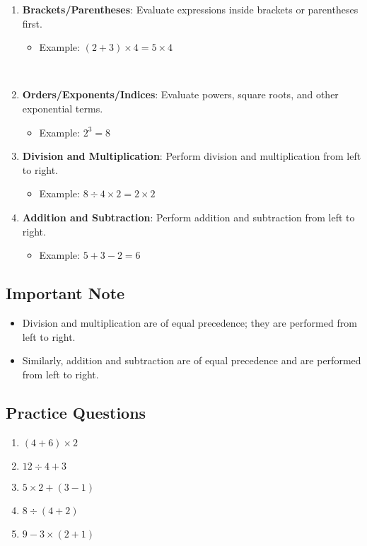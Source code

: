 \documentclass{article}
\begin{document}
\begin{enumerate}
\item \textbf{Brackets/Parentheses}: Evaluate expressions inside brackets or parentheses first.

\begin{itemize}
\item Example: \( (2 + 3) \times 4 = 5 \times 4 \)
\end{itemize}
\\

\item \textbf{Orders/Exponents/Indices}: Evaluate powers, square roots, and other exponential terms.
\begin{itemize}
\item Example: \( 2^3 = 8 \)
\end{itemize}
\item \textbf{Division and Multiplication}: Perform division and multiplication from left to right.
\begin{itemize}
\item Example: \( 8 \div 4 \times 2 = 2 \times 2 \)
\end{itemize}
\item \textbf{Addition and Subtraction}: Perform addition and subtraction from left to right.
\begin{itemize}
\item Example: \( 5 + 3 - 2 = 6 \)
\end{itemize}
\end{enumerate}

\subsection{Important Note}

\begin{itemize}
\item Division and multiplication are of equal precedence; they are performed from left to right.
\item Similarly, addition and subtraction are of equal precedence and are performed from left to right.
\end{itemize}

\subsection{Practice Questions}

\begin{enumerate}
\item \( (4 + 6) \times 2 \)
\item \( 12 \div 4 + 3 \)
\item \( 5 \times 2 + (3 - 1) \)
\item \( 8 \div (4 + 2) \)
\item \( 9 - 3 \times (2 + 1) \)
\end{enumerate}
\end{document}
